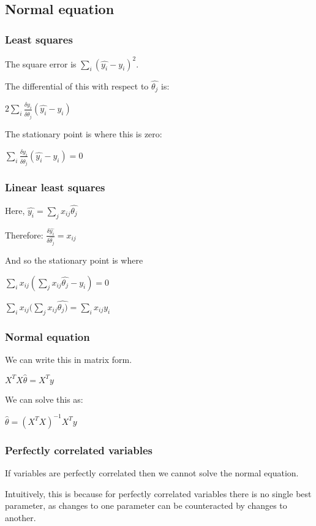 
\subsection{Normal equation}

\subsubsection{Least squares}

The square error is \(\sum_i (\hat{y_i}-y_i)^2\).

The differential of this with respect to \(\hat{\theta_j }\) is:

\(2\sum_i \frac{\delta \hat{y_i}}{\delta \hat{\theta_j}}(\hat{y_i}-y_i)\)

The stationary point is where this is zero:

\(\sum_i \frac{\delta \hat{y_i}}{\delta \hat{\theta_j}}(\hat{y_i}-y_i)=0\)

\subsubsection{Linear least squares}

Here, \(\hat{y_i}= \sum_j x_{ij}\hat{\theta_j}\)

Therefore: \(\frac{\delta \hat{y_i}}{\delta \hat{\theta_j}}=x_{ij}\)

And so the stationary point is where

\(\sum_i x_{ij}( \sum_j x_{ij}\hat{\theta_j }-y_i)=0\)

\(\sum_i x_{ij}( \sum_j x_{ij}\hat{\theta_j)}= \sum_i x_{ij}y_i\)

\subsubsection{Normal equation}

We can write this in matrix form.

\(X^TX\hat{\theta }=X^Ty\)

We can solve this as:

\(\hat{\theta }=(X^TX)^{-1}X^Ty\)

\subsubsection{Perfectly correlated variables}

If variables are perfectly correlated then we cannot solve the normal equation.

Intuitively, this is because for perfectly correlated variables there is no single best parameter, as changes to one parameter can be counteracted by changes to another.

